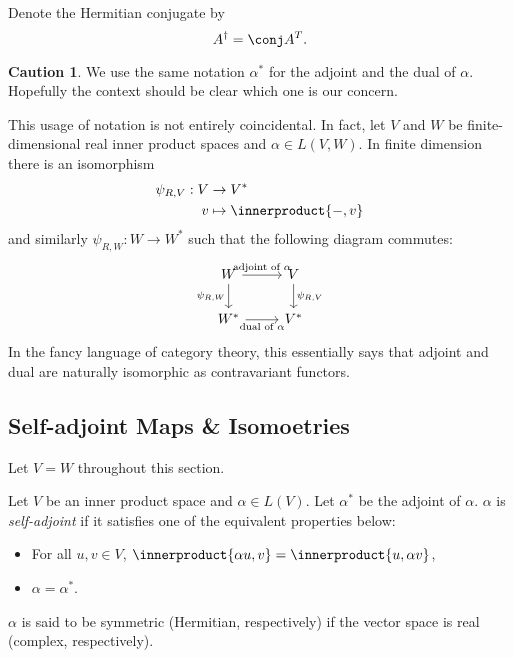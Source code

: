 \documentclass[a4paper]{article}
\newcommand*{\ip}{\innerproduct}
\theoremstyle{definition}
\newtheorem*{caution}{Caution}
\begin{document}
\begin{notation}
  Denote the Hermitian conjugate by
  \[
    A^\dag = \conj A^T.
  \]
\end{notation}

\begin{caution}
  We use the same notation \(\alpha^*\) for the adjoint and the dual of \(\alpha\). Hopefully the context should be clear which one is our concern.
\end{caution}

\begin{remark}
  This usage of notation is not entirely coincidental. In fact, let \(V\) and \(W\) be finite-dimensional real inner product spaces and \(\alpha \in L(V, W)\). In finite dimension there is an isomorphism
  \begin{align*}
    \psi_{R, V}: V &\to V^* \\
    v &\mapsto \ip{-, v}
  \end{align*}
  and similarly \(\psi_{R, W}: W \to W^*\) such that the following diagram commutes:
  \[
    \begin{tikzcd}
      W \ar[r, "\text{adjoint of } \alpha"] \ar[d, "\psi_{R, W}"']  & V \ar[d, "\psi_{R, V}"] \\
      W^* \ar[r, "\text{dual of } \alpha"'] & V^*
    \end{tikzcd}
  \]
  In the fancy language of category theory, this essentially says that adjoint and dual are naturally isomorphic as contravariant functors.
\end{remark}

\subsection{Self-adjoint Maps \& Isomoetries}

Let \(V = W\) throughout this section.

\begin{definition}
  Let \(V\) be an inner product space and \(\alpha \in L(V)\). Let \(\alpha^*\) be the adjoint of \(\alpha\). \(\alpha\) is \emph{self-adjoint} if it satisfies one of the equivalent properties below:
  \begin{itemize}
  \item For all \(u, v \in V\), \(\ip{\alpha u, v} = \ip{u, \alpha v}\),
  \item \(\alpha = \alpha^*\).
  \end{itemize}

  \(\alpha\) is said to be symmetric (Hermitian, respectively) if the vector space is real (complex, respectively).
\end{definition}
\end{document}

